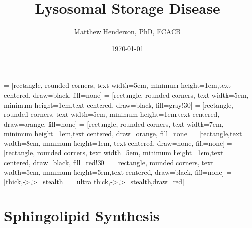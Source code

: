 \documentclass{scrartcl}
\author{Matthew Henderson, PhD, FCACB}
\date{\today}
\title{Lysosomal Storage Disease}
\begin{document}
\maketitle
\tableofcontents


 = [rectangle, rounded corners, text width=5em, minimum height=1em,text centered, draw=black, fill=none]
 = [rectangle, rounded corners, text width=5em, minimum height=1em,text centered, draw=black, fill=gray!30]
 = [rectangle, rounded corners, text width=5em, minimum height=1em,text centered, draw=orange, fill=none]
 = [rectangle, rounded corners, text width=7em, minimum height=1em,text centered, draw=orange, fill=none]
 = [rectangle,text width=8em, minimum height=1em, text centered, draw=none, fill=none]
 = [rectangle, rounded corners, text width=5em, minimum height=1em,text centered, draw=black, fill=red!30]
 = [rectangle, rounded corners, text width=5em, minimum height=5em,text centered, draw=black, fill=none]
 = [thick,->,>=stealth]
 = [ultra thick,->,>=stealth,draw=red]


\section{Sphingolipid Synthesis}
\label{sec:org6b1e6ee}
\end{document}
